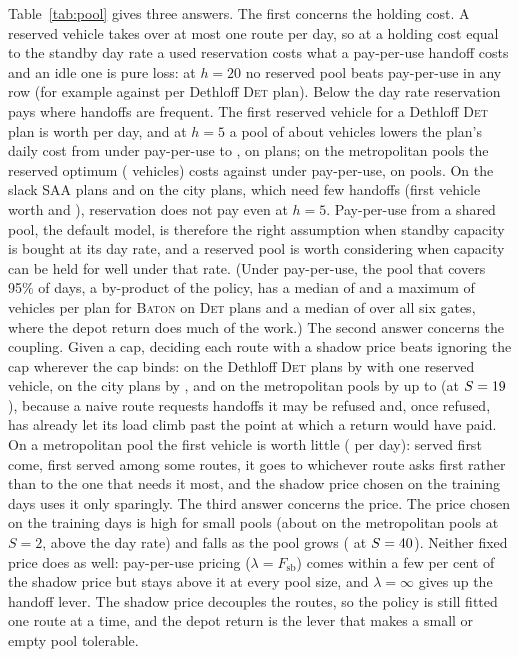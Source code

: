 \documentclass[preprint,authoryear,12pt]{elsarticle}
\theoremstyle{definition}
\theoremstyle{remark}
\begin{document}
Table~\ref{tab:pool} gives three answers. The first concerns the
holding cost. A reserved vehicle takes over at most one route per day,
so at a holding cost equal to the standby day rate a used reservation
costs what a pay-per-use handoff costs and an idle one is pure loss:
at $h = 20$ no reserved pool beats pay-per-use in any row (for example
\poolDethTotHigh{} against \poolDethPpu{} per Dethloff \textsc{Det}
plan). Below the day rate reservation pays where handoffs are frequent.
The first reserved vehicle for a Dethloff \textsc{Det} plan is worth
\poolDethBreakEven{} per day, and at $h = 5$ a pool of about
\poolDethSstarLow{} vehicles lowers the plan's daily cost from
\poolDethPpu{} under pay-per-use to \poolDethTotLow{}, on
\poolDethBeatLow{} plans; on the metropolitan pools the reserved optimum
(\poolMetroSstarLow{} vehicles) costs \poolMetroTotLow{} against
\poolMetroPpu{} under pay-per-use, on \poolMetroBeatLow{} pools. On the
slack \textsc{SAA} plans and on the city plans, which need few handoffs
(first vehicle worth \poolDethSaaBreakEven{} and \poolCityBreakEven{}),
reservation does not pay even at $h = 5$. Pay-per-use from a shared
pool, the default model, is therefore the right assumption when standby
capacity is bought at its day rate, and a reserved pool is worth
considering when capacity can be held for well under that rate. (Under
pay-per-use, the pool that covers 95\% of days, a by-product of the
policy, has a median of \poolDetMed{} and a maximum of \poolDetMax{}
vehicles per plan for \textsc{Baton} on \textsc{Det} plans and a median
of \poolBatonMed{} over all six gates, where the depot return does much
of the work.) The second answer concerns the coupling. Given a cap, deciding each route
with a shadow price beats ignoring the cap wherever the cap binds: on
the Dethloff \textsc{Det} plans by \poolDethGainOne{} with one reserved
vehicle, on the city plans by \poolCityGainOne, and on the metropolitan
pools by up to \poolMetroGainMax{} (at $S = 19$), because
a naive route requests handoffs it may be refused and, once refused, has
already let its load climb past the point at which a return would have
paid. On a metropolitan pool the first vehicle is worth little
(\poolMetroBreakEven{} per day): served first come, first served among
some \poolMetroK{} routes, it goes to whichever route asks first rather
than to the one that needs it most, and the shadow price chosen on the
training days uses it only sparingly. The third answer concerns
the price. The price chosen on the training days is high for small pools
(about \poolMetroLamSmall{} on the metropolitan pools at $S = 2$, above
the day rate) and falls as the pool grows (\poolMetroLamLarge{} at $S =
40$). Neither fixed price does as well: pay-per-use pricing
($\lambda = F_{\mathrm{sb}}$) comes within a few per cent of the shadow
price but stays above it at every pool size, and $\lambda = \infty$
gives up the handoff lever. The shadow price
decouples the routes, so the policy is still fitted one route at a time,
and the depot return is the lever that makes a small or empty pool
tolerable.
\end{document}
